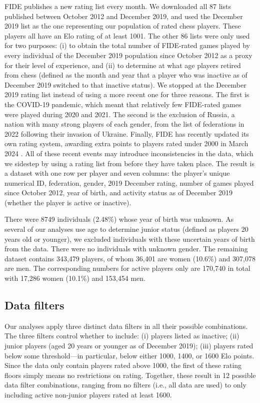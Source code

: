 \documentclass[9pt,twocolumn,twoside,lineno]{pnas-new}
\begin{document}
FIDE publishes a new rating list every month. We downloaded all 87 lists published between October 2012 and December 2019, and used the December 2019 list as the one representing our population of rated chess players. These players all have an Elo rating of at least 1001. The other 86 lists were only used for two purposes: (i) to obtain the total number of FIDE-rated games played by every individual of the December 2019 population since October 2012 as a proxy for their level of experience, and (ii) to determine at what age players retired from chess (defined as the month and year that a player who was inactive as of December 2019 switched to that inactive status). We stopped at the December 2019 rating list instead of using a more recent one for three reasons. The first is the COVID-19 pandemic, which meant that relatively few FIDE-rated games were played during 2020 and 2021. The second is the exclusion of Russia, a nation with many strong players of each gender, from the list of federations in 2022 following their invasion of Ukraine. Finally, FIDE has recently updated its own rating system, awarding extra points to players rated under 2000 in March 2024 \cite{sonas2024compression}. All of these recent events may introduce inconsistencies in the data, which we sidestep by using a rating list from before they have taken place. The result is a dataset with one row per player and seven columns: the player's unique numerical ID, federation, gender, 2019 December rating, number of games played since October 2012, year of birth, and activity status as of December 2019 (whether the player is active or inactive). 

There were 8749 individuals (2.48\%) whose year of birth was unknown. As several of our analyses use age to determine junior status (defined as players 20 years old or younger), we excluded individuals with these uncertain years of birth from the data. There were no individuals with unknown gender. The remaining dataset contains 343,479 players, of whom 36,401 are women (10.6\%) and 307,078 are men. The corresponding numbers for active players only are 170,740 in total with 17,286 women (10.1\%) and 153,454 men.


\subsection*{Data filters}

Our analyses apply three distinct data filters in all their possible combinations. The three filters control whether to include: (i) players listed as inactive; (ii) junior players (aged 20 years or younger as of December 2019); (iii) players rated below some threshold---in particular, below either 1000, 1400, or 1600 Elo points. Since the data only contain players rated above 1000, the first of these rating floors simply means no restrictions on rating. Together, these result in 12 possible data filter combinations, ranging from no filters (i.e., all data are used) to only including active non-junior players rated at least 1600.
\end{document}
